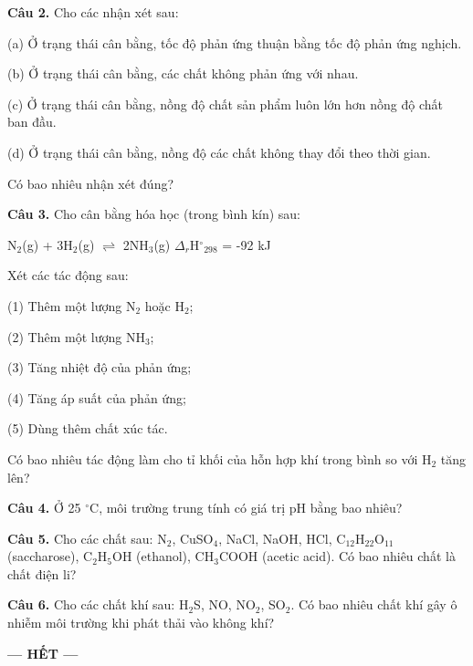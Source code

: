 \documentclass[13pt,a4paper]{article}
\begin{document}
\vspace{2.0cm}

\textbf{Câu 2.} Cho các nhận xét sau:

(a) Ở trạng thái cân bằng, tốc độ phản ứng thuận bằng tốc độ phản ứng nghịch.

(b) Ở trạng thái cân bằng, các chất không phản ứng với nhau.

(c) Ở trạng thái cân bằng, nồng độ chất sản phẩm luôn lớn hơn nồng độ chất ban đầu.

(d) Ở trạng thái cân bằng, nồng độ các chất không thay đổi theo thời gian.

Có bao nhiêu nhận xét đúng?

\vspace{2.0cm}

\textbf{Câu 3.} Cho cân bằng hóa học (trong bình kín) sau:

N$_{2}$(g) + 3H$_{2}$(g) $\rightleftharpoons$ 2NH$_{3}$(g)    $\Delta$$_{r}$H$^\circ$$_{298}$ = -92 kJ

Xét các tác động sau:

(1) Thêm một lượng N$_{2}$ hoặc H$_{2}$;

(2) Thêm một lượng NH$_{3}$;

(3) Tăng nhiệt độ của phản ứng;

(4) Tăng áp suất của phản ứng;

(5) Dùng thêm chất xúc tác.

Có bao nhiêu tác động làm cho tỉ khối của hỗn hợp khí trong bình so với H$_{2}$ tăng lên?

\vspace{2.0cm}

\textbf{Câu 4.} Ở 25 $^\circ\text{C}$, môi trường trung tính có giá trị pH bằng bao nhiêu?

\vspace{2.0cm}

\textbf{Câu 5.} Cho các chất sau: N$_{2}$, CuSO$_{4}$, NaCl, NaOH, HCl, C$_{12}$H$_{22}$O$_{11}$ (saccharose), C$_{2}$H$_{5}$OH (ethanol), CH$_{3}$COOH (acetic acid). Có bao nhiêu chất là chất điện li?

\vspace{2.0cm}

\textbf{Câu 6.} Cho các chất khí sau: H$_{2}$S, NO, NO$_{2}$, SO$_{2}$. Có bao nhiêu chất khí gây ô nhiễm môi trường khi phát thải vào không khí?

\vspace{2.0cm}

\begin{center}
\textbf{--- HẾT ---}
\end{center}
\end{document}
